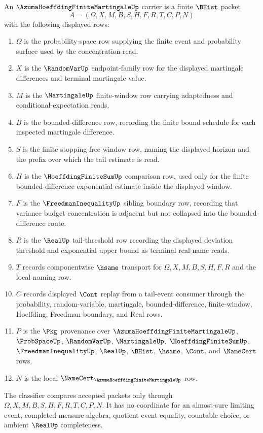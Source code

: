 \begin{definition}
\label{def:azuma-hoeffding-finite-martingale-carrier}
An $\AzumaHoeffdingFiniteMartingaleUp$ carrier is a finite $\BHist$ packet
$$
A=(\Omega,X,M,B,S,H,F,R,T,C,P,N)
$$
with the following displayed rows:
\begin{enumerate}
\item $\Omega$ is the probability-space row supplying the finite event and probability surface used by the concentration read.
\item $X$ is the $\RandomVarUp$ endpoint-family row for the displayed martingale differences and terminal martingale value.
\item $M$ is the $\MartingaleUp$ finite-window row carrying adaptedness and conditional-expectation reads.
\item $B$ is the bounded-difference row, recording the finite bound schedule for each inspected martingale difference.
\item $S$ is the finite stopping-free window row, naming the displayed horizon and the prefix over which the tail estimate is read.
\item $H$ is the $\HoeffdingFiniteSumUp$ comparison row, used only for the finite bounded-difference exponential estimate inside the displayed window.
\item $F$ is the $\FreedmanInequalityUp$ sibling boundary row, recording that variance-budget concentration is adjacent but not collapsed into the bounded-difference route.
\item $R$ is the $\RealUp$ tail-threshold row recording the displayed deviation threshold and exponential upper bound as terminal real-name reads.
\item $T$ records componentwise $\hsame$ transport for $\Omega,X,M,B,S,H,F,R$ and the local naming row.
\item $C$ records displayed $\Cont$ replay from a tail-event consumer through the probability, random-variable, martingale, bounded-difference, finite-window, Hoeffding, Freedman-boundary, and Real rows.
\item $P$ is the $\Pkg$ provenance over $\AzumaHoeffdingFiniteMartingaleUp$, $\ProbSpaceUp$, $\RandomVarUp$, $\MartingaleUp$, $\HoeffdingFiniteSumUp$, $\FreedmanInequalityUp$, $\RealUp$, $\BHist$, $\hsame$, $\Cont$, and $\NameCert$ rows.
\item $N$ is the local $\NameCert_{\AzumaHoeffdingFiniteMartingaleUp}$ row.
\end{enumerate}
The classifier compares accepted packets only through $\Omega,X,M,B,S,H,F,R,T,C,P,N$. It has no coordinate for an almost-sure limiting event, completed measure algebra, quotient event equality, countable choice, or ambient $\RealUp$ completeness.
\end{definition}

